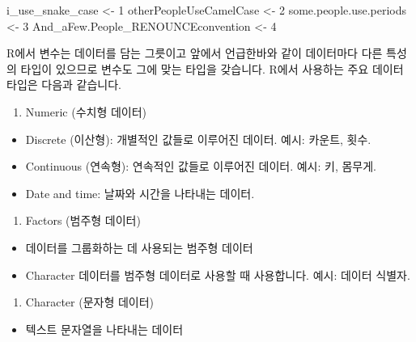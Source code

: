 \documentclass[
  a4paper,
]{book}
\newenvironment{Shaded}{\begin{snugshade}}{\end{snugshade}}
\newcommand{\DecValTok}[1]{\textcolor[rgb]{0.68,0.00,0.00}{#1}}
\newcommand{\NormalTok}[1]{\textcolor[rgb]{0.00,0.23,0.31}{#1}}
\newcommand{\OtherTok}[1]{\textcolor[rgb]{0.00,0.23,0.31}{#1}}
\providecommand{\tightlist}{%
  \setlength{\itemsep}{0pt}\setlength{\parskip}{0pt}}\usepackage{longtable,booktabs,array}
\begin{document}
\begin{Shaded}
\begin{Highlighting}[]
\NormalTok{i\_use\_snake\_case }\OtherTok{\textless{}{-}} \DecValTok{1}
\NormalTok{otherPeopleUseCamelCase }\OtherTok{\textless{}{-}} \DecValTok{2}
\NormalTok{some.people.use.periods }\OtherTok{\textless{}{-}} \DecValTok{3}
\NormalTok{And\_aFew.People\_RENOUNCEconvention }\OtherTok{\textless{}{-}} \DecValTok{4}
\end{Highlighting}
\end{Shaded}

R에서 변수는 데이터를 담는 그릇이고 앞에서 언급한바와 같이 데이터마다
다른 특성의 타입이 있으므로 변수도 그에 맞는 타입을 갖습니다. R에서
사용하는 주요 데이터 타입은 다음과 같습니다.

\begin{enumerate}
\def\labelenumi{\arabic{enumi}.}
\tightlist
\item
  Numeric (수치형 데이터)
\end{enumerate}

\begin{itemize}
\tightlist
\item
  Discrete (이산형): 개별적인 값들로 이루어진 데이터. 예시: 카운트,
  횟수.
\item
  Continuous (연속형): 연속적인 값들로 이루어진 데이터. 예시: 키,
  몸무게.
\item
  Date and time: 날짜와 시간을 나타내는 데이터.
\end{itemize}

\begin{enumerate}
\def\labelenumi{\arabic{enumi}.}
\setcounter{enumi}{1}
\tightlist
\item
  Factors (범주형 데이터)
\end{enumerate}

\begin{itemize}
\tightlist
\item
  데이터를 그룹화하는 데 사용되는 범주형 데이터
\item
  Character 데이터를 범주형 데이터로 사용할 때 사용합니다. 예시: 데이터
  식별자.
\end{itemize}

\begin{enumerate}
\def\labelenumi{\arabic{enumi}.}
\setcounter{enumi}{2}
\tightlist
\item
  Character (문자형 데이터)
\end{enumerate}

\begin{itemize}
\tightlist
\item
  텍스트 문자열을 나타내는 데이터
\end{itemize}
\end{document}
